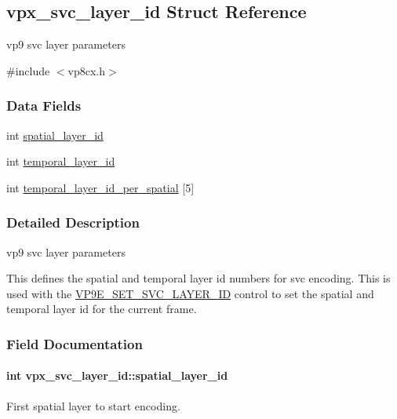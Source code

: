 \hypertarget{structvpx__svc__layer__id}{}\subsection{vpx\+\_\+svc\+\_\+layer\+\_\+id Struct Reference}
\label{structvpx__svc__layer__id}


vp9 svc layer parameters  




{\ttfamily \#include $<$vp8cx.\+h$>$}

\subsubsection*{Data Fields}
\begin{DoxyCompactItemize}
\item 
int \hyperlink{structvpx__svc__layer__id_a91ae13acc06ecde84886601374d4c872}{spatial\+\_\+layer\+\_\+id}
\item 
int \hyperlink{structvpx__svc__layer__id_a365859e15e7a6ff2b06106ea00820ea7}{temporal\+\_\+layer\+\_\+id}
\item 
int \hyperlink{structvpx__svc__layer__id_a72bab7b950f5687b08fd40a9b34e9500}{temporal\+\_\+layer\+\_\+id\+\_\+per\+\_\+spatial} \mbox{[}5\mbox{]}
\end{DoxyCompactItemize}


\subsubsection{Detailed Description}
vp9 svc layer parameters 

This defines the spatial and temporal layer id numbers for svc encoding. This is used with the \hyperlink{group__vp8__encoder_gga6deae3d561c838952552c3d3756322eca090ad9dcb1f2eea2af60f4737c5bf514}{V\+P9\+E\+\_\+\+S\+E\+T\+\_\+\+S\+V\+C\+\_\+\+L\+A\+Y\+E\+R\+\_\+\+ID} control to set the spatial and temporal layer id for the current frame. 

\subsubsection{Field Documentation}
\paragraph[{\texorpdfstring{spatial\+\_\+layer\+\_\+id}{spatial_layer_id}}]{\setlength{\rightskip}{0pt plus 5cm}int vpx\+\_\+svc\+\_\+layer\+\_\+id\+::spatial\+\_\+layer\+\_\+id}\hypertarget{structvpx__svc__layer__id_a91ae13acc06ecde84886601374d4c872}{}\label{structvpx__svc__layer__id_a91ae13acc06ecde84886601374d4c872}
First spatial layer to start encoding. 

